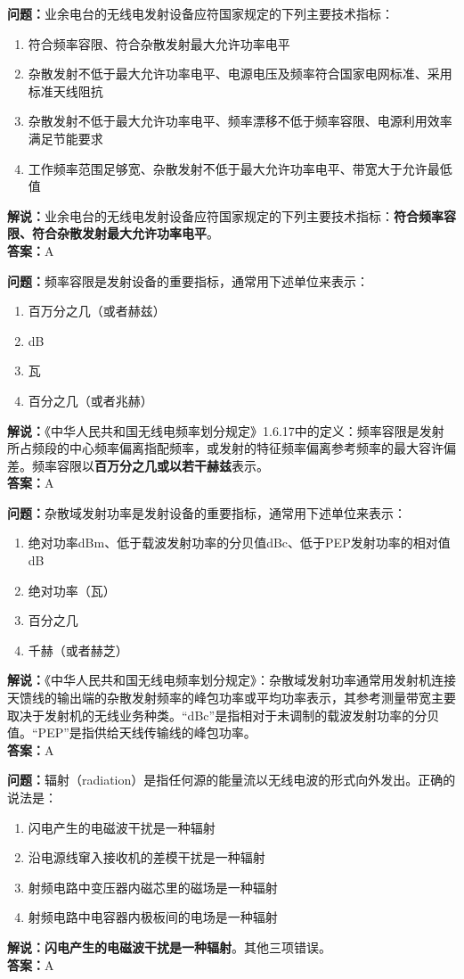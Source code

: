 \textbf{问题：}业余电台的无线电发射设备应符国家规定的下列主要技术指标：
\begin{enumerate}[label=\Alph*), leftmargin=1cm]
	\item 符合频率容限、符合杂散发射最大允许功率电平
	\item 杂散发射不低于最大允许功率电平、电源电压及频率符合国家电网标准、采用标准天线阻抗
	\item 杂散发射不低于最大允许功率电平、频率漂移不低于频率容限、电源利用效率满足节能要求
	\item 工作频率范围足够宽、杂散发射不低于最大允许功率电平、带宽大于允许最低值
\end{enumerate}
\textbf{解说：}业余电台的无线电发射设备应符国家规定的下列主要技术指标：\textbf{符合频率容限、符合杂散发射最大允许功率电平}。\\\textbf{答案：}A%

\textbf{问题：}频率容限是发射设备的重要指标，通常用下述单位来表示：
\begin{enumerate}[label=\Alph*), leftmargin=1cm]
	\item 百万分之几（或者赫兹）
	\item dB
	\item 瓦
	\item 百分之几（或者兆赫）
\end{enumerate}
\textbf{解说：}《中华人民共和国无线电频率划分规定》1.6.17中的定义：频率容限是发射所占频段的中心频率偏离指配频率，或发射的特征频率偏离参考频率的最大容许偏差。频率容限以\textbf{百万分之几或以若干赫兹}表示。\\\textbf{答案：}A

\textbf{问题：}杂散域发射功率是发射设备的重要指标，通常用下述单位来表示：
\begin{enumerate}[label=\Alph*), leftmargin=1cm]
	\item 绝对功率dBm、低于载波发射功率的分贝值dBc、低于PEP发射功率的相对值dB
	\item 绝对功率（瓦）
	\item 百分之几
	\item 千赫（或者赫芝）
\end{enumerate}
\textbf{解说：}《中华人民共和国无线电频率划分规定》：杂散域发射功率通常用发射机连接天馈线的输出端的杂散发射频率的峰包功率或平均功率表示，其参考测量带宽主要取决于发射机的无线业务种类。“dBc”是指相对于未调制的载波发射功率的分贝值。“PEP”是指供给天线传输线的峰包功率。\\\textbf{答案：}A%

\textbf{问题：}辐射（radiation）是指任何源的能量流以无线电波的形式向外发出。正确的说法是：
\begin{enumerate}[label=\Alph*), leftmargin=1cm]
	\item 闪电产生的电磁波干扰是一种辐射
	\item 沿电源线窜入接收机的差模干扰是一种辐射
	\item 射频电路中变压器内磁芯里的磁场是一种辐射
	\item 射频电路中电容器内极板间的电场是一种辐射
\end{enumerate}
\textbf{解说：闪电产生的电磁波干扰是一种辐射}。其他三项错误。\\\textbf{答案：}A%


